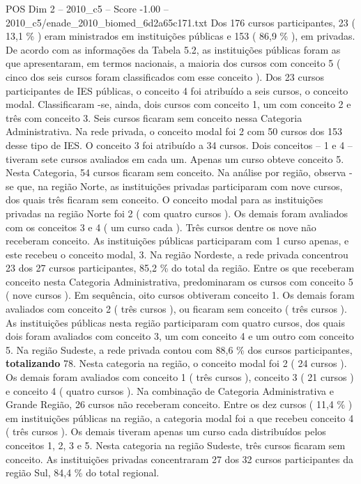 \begin{textsample}{POS Dim 2 – 2010\_c5 – Score -1.00 – 2010\_c5/enade\_2010\_biomed\_6d2a65c171.txt}
Dos 176 cursos participantes, 23 ( 13,1 \% ) eram ministrados em instituições públicas e 153 ( 86,9 \% ), em privadas.
De acordo com as informações da Tabela 5.2, as instituições públicas foram as que apresentaram, em termos nacionais, a maioria dos cursos com conceito 5 ( cinco dos seis cursos foram classificados com esse conceito ).
Dos 23 cursos participantes de IES públicas, o conceito 4 foi atribuído a seis cursos, o conceito modal.
Classificaram -se, ainda, dois cursos com conceito 1, um com conceito 2 e três com conceito 3.
Seis cursos ficaram sem conceito nessa Categoria Administrativa.
Na rede privada, o conceito modal foi 2 com 50 cursos dos 153 desse tipo de IES.
O conceito 3 foi atribuído a 34 cursos.
Dois conceitos – 1 e 4 – tiveram sete cursos avaliados em cada um.
Apenas um curso obteve conceito 5.
Nesta Categoria, 54 cursos ficaram sem conceito.
Na análise por região, observa -se que, na região Norte, as instituições privadas participaram com nove cursos, dos quais três ficaram sem conceito.
O conceito modal para as instituições privadas na região Norte foi 2 ( com quatro cursos ).
Os demais foram avaliados com os conceitos 3 e 4 ( um curso cada ).
Três cursos dentre os nove não receberam conceito.
As instituições públicas participaram com 1 curso apenas, e este recebeu o conceito modal, 3.
Na região Nordeste, a rede privada concentrou 23 dos 27 cursos participantes, 85,2 \% do total da região.
Entre os que receberam conceito nesta Categoria Administrativa, predominaram os cursos com conceito 5 ( nove cursos ).
Em sequência, oito cursos obtiveram conceito 1.
Os demais foram avaliados com conceito 2 ( três cursos ), ou ficaram sem conceito ( três cursos ).
As instituições públicas nesta região participaram com quatro cursos, dos quais dois foram avaliados com conceito 3, um com conceito 4 e um outro com conceito 5.
Na região Sudeste, a rede privada contou com 88,6 \% dos cursos participantes, \textbf{totalizando} 78.
Nesta categoria na região, o conceito modal foi 2 ( 24 cursos ).
Os demais foram avaliados com conceito 1 ( três cursos ), conceito 3 ( 21 cursos ) e conceito 4 ( quatro cursos ).
Na combinação de Categoria Administrativa e Grande Região, 26 cursos não receberam conceito.
Entre os dez cursos ( 11,4 \% ) em instituições públicas na região, a categoria modal foi a que recebeu conceito 4 ( três cursos ).
Os demais tiveram apenas um curso cada distribuídos pelos conceitos 1, 2, 3 e 5.
Nesta categoria na região Sudeste, três cursos ficaram sem conceito.
As instituições privadas concentraram 27 dos 32 cursos participantes da região Sul, 84,4 \% do total regional.

\end{textsample}
